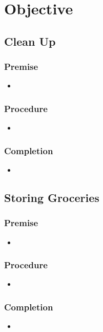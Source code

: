 \documentclass[main.tex]{subfiles}
\begin{document}
	
	\chapter{Objective}
	\section{Clean Up}
	
	\subsection{Premise}
		\begin{itemize}
			\item 
		\end{itemize} 
		
	\subsection{Procedure}
		\begin{itemize}			
			\item 				
		\end{itemize}
	
	\subsection{Completion}
		\begin{itemize}
			\item 		
		\end{itemize}
	
	\section{Storing Groceries}
	
	\subsection{Premise}
		\begin{itemize}
			\item 
		\end{itemize} 
		
	\subsection{Procedure}
		\begin{itemize}			
			\item 						
		\end{itemize}
	
	\subsection{Completion}
		\begin{itemize}
			\item 	
		\end{itemize}
\end{document}
